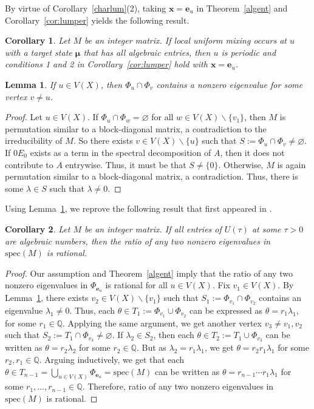 \documentclass[11pt]{article}
\newtheorem{lemma}{Lemma}
\newtheorem{corollary}{Corollary}
\newcommand{\be}{\mathbf e}
\newcommand{\bx}{\mathbf x}
\newcommand{\bmu}{{\boldsymbol{\mu}}}
\newcommand\spec{{\mathrm{spec}}}
\newcommand{\supp}{{\Phi}}
\begin{document}
By virtue of Corollary~\ref{charlum}(2), taking $\bx=\be_u$ in Theorem~\ref{algent} and Corollary~\ref{cor:lumper} yields the following result.

\begin{corollary}
\label{algent1}
Let $M$ be an integer matrix. If local uniform mixing occurs at $u$ with a target state $\bmu$ that has all algebraic entries, then $u$ is periodic and conditions 1 and 2 in Corollary~\ref{cor:lumper} hold with $\bx=\be_u$.
\end{corollary}

\begin{lemma}
\label{lem:sup}
If $u\in V(X)$, then $\supp_{u}\cap \supp_{v}$ contains a nonzero eigenvalue for some vertex $v\neq u$.
\end{lemma}

\begin{proof}
Let $u\in V(X)$. If $\supp_{u}\cap \supp_{w}=\varnothing$ for all $w\in V(X)\backslash\{v_1\}$, then $M$ is permutation similar to a block-diagonal matrix, a contradiction to the irreducibility of $M$. So there exists $v\in V(X)\backslash \{u\}$ such that $S:=\supp_{u}\cap \supp_{v}\neq \varnothing$. If $0E_0$ exists as a term in the spectral decomposition of $A$, then it does not contribute to $A$ entrywise. Thus, it must be that $S\neq \{0\}$. Otherwise, $M$ is again permutation similar to a block-diagonal matrix, a contradiction. Thus, there is some $\lambda\in S$ such that $\lambda\neq 0$.
\end{proof}

Using Lemma~\ref{lem:sup}, we reprove the following result that first appeared in \cite[Theorem 3.4]{Godsil2013}.

\begin{corollary}
Let $M$ be an integer matrix. If all entries of $U(\tau)$ at some $\tau>0$ are algebraic numbers, then the ratio of any two nonzero eigenvalues in $\spec(M)$ is rational.
\end{corollary}

\begin{proof}
Our assumption and Theorem~\ref{algent} imply that the ratio of any two nonzero eigenvalues in $\supp_{\be_u}$ is rational for all $u\in V(X)$. Fix $v_1\in V(X)$. By Lemma~\ref{lem:sup}, there exists $v_2\in V(X)\backslash \{v_1\}$ such that $S_1:=\supp_{v_1}\cap \supp_{v_2}$ contains an eigenvalue $\lambda_1\neq 0$. Thus, each $\theta\in T_1:=\supp_{v_1}\cup\supp_{v_2}$ can be expressed as $\theta=r_1\lambda_1$, for some $r_1\in\mathbb{Q}$. Applying the same argument, we get another vertex $v_3\neq v_1,v_2$ such that $S_2:=T_1\cap\supp_{v_3}\neq \varnothing$. If $\lambda_2\in S_2$, then each $\theta\in T_2:=T_1\cup\supp_{v_3}$ can be written as $\theta=r_2\lambda_2$ for some $r_2\in\mathbb{Q}$. But as $\lambda_2=r_1\lambda_1$, we get $\theta=r_2r_1\lambda_1$ for some $r_2,r_1\in\mathbb{Q}.$ Arguing inductively, we get that each $\theta\in T_{n-1}=\bigcup_{u\in V(X)}\supp_{\be_u}=\spec(M)$ can be written as $\theta=r_{n-1}\cdots r_1\lambda_1$ for some $r_1,\ldots,r_{n-1}\in\mathbb{Q}$. Therefore, ratio of any two nonzero eigenvalues in $\spec(M)$ is rational.
\end{proof}
\end{document}
